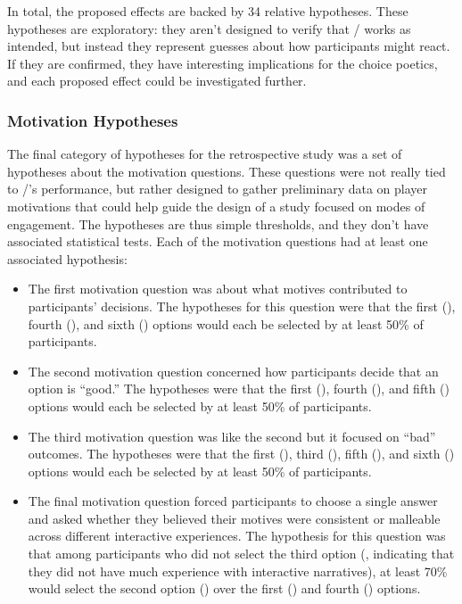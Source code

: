 In total, the proposed effects are backed by 34 relative hypotheses.
%
These hypotheses are exploratory: they aren't designed to verify that \dunyazad/ works as intended, but instead they represent guesses about how participants might react.
%
If they are confirmed, they have interesting implications for the choice poetics, and each proposed effect could be investigated further.


\subsubsection{Motivation Hypotheses}

The final category of hypotheses for the retrospective study was a set of hypotheses about the motivation questions.
%
These questions were not really tied to \dunyazad/'s performance, but rather designed to gather preliminary data on player motivations that could help guide the design of a study focused on modes of engagement.
%
The hypotheses are thus simple thresholds, and they don't have associated statistical tests.
%
Each of the motivation questions had at least one associated hypothesis:

\begin{itemize}
  \item The first motivation question was about what motives contributed to participants' decisions. The hypotheses for this question were that the first (), fourth (), and sixth () options would each be selected by at least 50\% of participants.
  \item The second motivation question concerned how participants decide that an option is ``good.'' The hypotheses were that the first (), fourth (), and fifth () options would each be selected by at least 50\% of participants.
  \item The third motivation question was like the second but it focused on ``bad'' outcomes. The hypotheses were that the first (), third (), fifth (), and sixth () options would each be selected by at least 50\% of participants.
  \item The final motivation question forced participants to choose a single answer and asked whether they believed their motives were consistent or malleable across different interactive experiences. The hypothesis for this question was that among participants who did not select the third option (, indicating that they did not have much experience with interactive narratives), at least 70\% would select the second option () over the first () and fourth () options.
\end{itemize}

